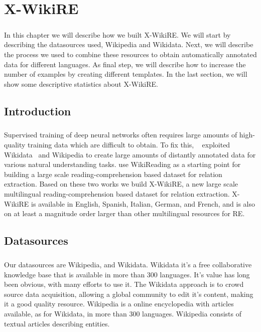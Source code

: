 \chapter{X-WikiRE}
\label{chpt:4}
\paragraph{}
In this chapter we will describe how we built X-WikiRE. We will start by describing the datasources used, Wikipedia and Wikidata. Next, we will describe the process we used to combine these resources to obtain automatically annotated data for different languages. As final step, we will describe how to increase the number of examples by creating different templates. In the last section, we will show some descriptive statistics about X-WikiRE.

\section{Introduction}
\paragraph{}
Supervised training of deep neural networks often requires large amounts of high-quality training data which are difficult to obtain.  To fix this, ~\cite{hewlett2016wikireading} exploited Wikidata~\citep{vwikidata} and Wikipedia to create large amounts of distantly annotated data for various natural understanding tasks. \cite{levy2017zero} use WikiReading as a starting point for building a large scale reading-comprehension based dataset for relation extraction. Based on these two works we build X-WikiRE, a new large scale multilingual reading-comprehension based dataset for relation extraction. X-WikiRE is available in English, Spanish, Italian, German, and French, and is also on at least a magnitude order larger than other multilingual resources for RE.

\section{Datasources}
\paragraph{}
Our datasources are Wikipedia, and Wikidata. Wikidata it's a free collaborative knowledge base that is available in more than 300 languages. It's value has long been obvious, with many efforts to use it. The Wikidata approach is to crowd source data acquisition, allowing a global community to edit it's content, making it a good quality resource.  Wikipedia is a online encyclopedia with articles available, as for Wikidata, in more than 300 languages. Wikipedia consists of textual articles describing entities. %

